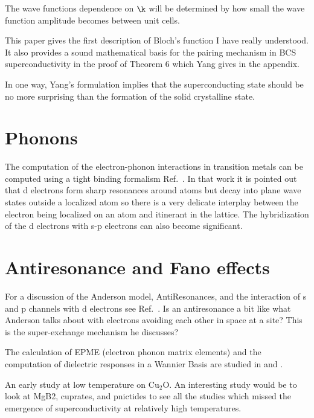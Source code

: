 The wave functions dependence on $\k$ will be determined by how small 
the wave function amplitude becomes between unit cells.

This paper gives the first description of Bloch's function I have really understood. 
It also provides a sound mathematical basis for the pairing mechanism in BCS
superconductivity in the proof of Theorem 6 which Yang gives in the appendix.

In one way, Yang's formulation implies that the superconducting state
should be no more surprising than the formation of the solid crystalline state.

\section{Phonons}
The computation of the electron-phonon interactions in transition metals
can be computed using a tight binding formalism Ref.~\cite{varma79}.
In that work it is pointed out that d electrons form sharp resonances around
atoms but decay into plane wave states outside a localized atom so there
is a very delicate interplay between the electron being localized on an atom
and itinerant in the lattice. 
The hybridization of the d electrons with s-p electrons can also become 
significant.

\section{Antiresonance and Fano effects}
For a discussion of the Anderson model, AntiResonances, and the interaction of s and p channels
with d electrons see Ref.~\cite{terakura77}. Is an antiresonance a bit like what Anderson
talks about with electrons avoiding each other in space at a site? This is the super-exchange
mechanism he discusses?

The calculation of EPME (electron phonon matrix elements) and the computation 
of dielectric responses in a Wannier Basis are studied in \cite{terakura77}
and \cite{hank76}.

An early study at low temperature on Cu$_{2}$O\cite{white78}. An interesting study would
be to look at MgB2, cuprates, and pnictides to see all the studies which missed
the emergence of superconductivity at relatively high temperatures.

